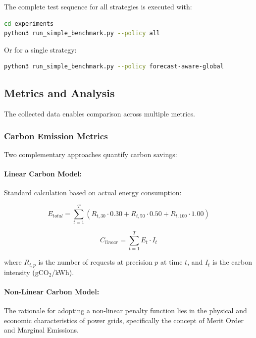 The complete test sequence for all strategies is executed with:

\begin{lstlisting}[language=bash,caption={Execution of all strategy tests.},label=lst:run-all-strategies]
cd experiments
python3 run_simple_benchmark.py --policy all
\end{lstlisting}

Or for a single strategy:

\begin{lstlisting}[language=bash]
python3 run_simple_benchmark.py --policy forecast-aware-global
\end{lstlisting}

\subsection{Metrics and Analysis}

The collected data enables comparison across multiple metrics.

\subsubsection{Carbon Emission Metrics}

Two complementary approaches quantify carbon savings:

\paragraph{Linear Carbon Model:} Standard calculation based on actual energy consumption:

\begin{equation}
    E_{total} = \sum_{t=1}^{T} (R_{t,30} \cdot 0.30 + R_{t,50} \cdot 0.50 + R_{t,100} \cdot 1.00)
\end{equation}

\begin{equation}
    C_{linear} = \sum_{t=1}^{T} E_t \cdot I_t
\end{equation}

where $R_{t,p}$ is the number of requests at precision $p$ at time $t$, and $I_t$ is the carbon intensity (gCO$_2$/kWh).

\paragraph{Non-Linear Carbon Model:} The rationale for adopting a non-linear penalty function lies in the physical and economic characteristics of power grids, specifically the concept of Merit Order and Marginal Emissions.

